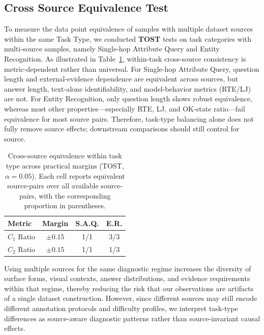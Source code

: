 \documentclass{article} %
\begin{document}
\subsection{Cross Source Equivalence Test}
To measure the data point equivalence of samples with multiple dataset sources within the same Task Type, we conducted \textbf{TOST} tests on task categories with multi‑source samples, namely Single‑hop Attribute Query and Entity Recognition. As illustrated in Table~\ref{tab:cross_source_consistency_one_table}, within-task cross-source consistency is metric-dependent rather than universal. For Single-hop Attribute Query, question length and external-evidence dependence are equivalent across sources, but answer length, text-alone identifiability, and model-behavior metrics (RTE/LJ) are not. For Entity Recognition, only question length shows robust equivalence, whereas most other properties---especially RTE, LJ, and OK-state ratio---fail equivalence for most source pairs. Therefore, task-type balancing alone does not fully remove source effects; downstream comparisons should still control for source. 

\begin{table}[htbp]
    \centering
    \caption{Cross-source equivalence within task type across practical margins (TOST, $\alpha=0.05$). Each cell reports equivalent source-pairs over all available source-pairs, with the corresponding proportion in parentheses.}
    \begin{tabular}{lccc}
    \toprule
    \textbf{Metric} & \textbf{Margin} & \textbf{S.A.Q.} &\textbf{ E.R.} \\
    \midrule
    $C_1$ Ratio & $\pm0.15$ & 1/1 & 3/3 \\
    $C_2$ Ratio & $\pm0.15$ & 1/1 & 1/3 \\
    \bottomrule
    \end{tabular}
    \label{tab:cross_source_consistency_one_table}
\end{table}

Using multiple sources for the same diagnostic regime increases the diversity of surface forms, visual contexts, answer distributions, and evidence requirements within that regime, thereby reducing the risk that our observations are artifacts of a single dataset construction. However, since different sources may still encode different annotation protocols and difficulty profiles, we interpret task-type differences as source-aware diagnostic patterns rather than source-invariant causal effects.
\end{document}
